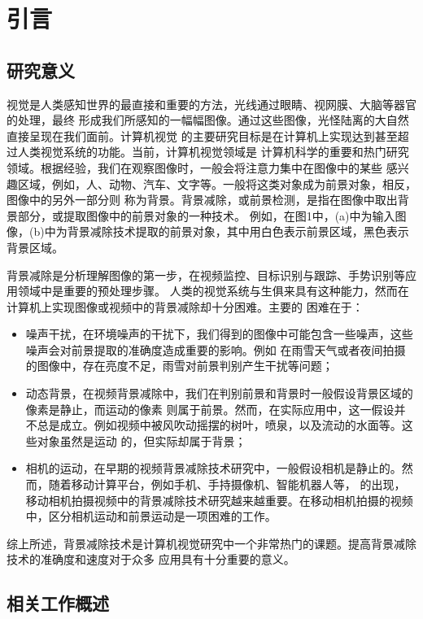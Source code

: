 \chapter{引言}
\label{cha:intro}

\section{研究意义}
\label{sec:first}
视觉是人类感知世界的最直接和重要的方法，光线通过眼睛、视网膜、大脑等器官的处理，最终
形成我们所感知的一幅幅图像。通过这些图像，光怪陆离的大自然直接呈现在我们面前。计算机视觉
的主要研究目标是在计算机上实现达到甚至超过人类视觉系统的功能。当前，计算机视觉领域是
计算机科学的重要和热门研究领域。根据经验，我们在观察图像时，一般会将注意力集中在图像中的某些
感兴趣区域，例如，人、动物、汽车、文字等。一般将这类对象成为前景对象，相反，图像中的另外一部分则
称为背景。背景减除，或前景检测，是指在图像中取出背景部分，或提取图像中的前景对象的一种技术。
例如，在图1中，(a)中为输入图像，(b)中为背景减除技术提取的前景对象，其中用白色表示前景区域，黑色表示背景区域。\par
背景减除是分析理解图像的第一步，在视频监控、目标识别与跟踪、手势识别等应用领域中是重要的预处理步骤。
人类的视觉系统与生俱来具有这种能力，然而在计算机上实现图像或视频中的背景减除却十分困难。主要的
困难在于：
 \begin{itemize}
    \item 噪声干扰，在环境噪声的干扰下，我们得到的图像中可能包含一些噪声，这些噪声会对前景提取的准确度造成重要的影响。例如
    在雨雪天气或者夜间拍摄的图像中，存在亮度不足，雨雪对前景判别产生干扰等问题；
    \item 动态背景，在视频背景减除中，我们在判别前景和背景时一般假设背景区域的像素是静止，而运动的像素
    则属于前景。然而，在实际应用中，这一假设并不总是成立。例如视频中被风吹动摇摆的树叶，喷泉，以及流动的水面等。这些对象虽然是运动
    的，但实际却属于背景；
    \item 相机的运动，在早期的视频背景减除技术研究中，一般假设相机是静止的。然而，随着移动计算平台，例如手机、手持摄像机、智能机器人等，
    的出现，移动相机拍摄视频中的背景减除技术研究越来越重要。在移动相机拍摄的视频中，区分相机运动和前景运动是一项困难的工作。
  \end{itemize}

\par
综上所述，背景减除技术是计算机视觉研究中一个非常热门的课题。提高背景减除技术的准确度和速度对于众多
应用具有十分重要的意义。
\section{相关工作概述}
\label{sec:second}

